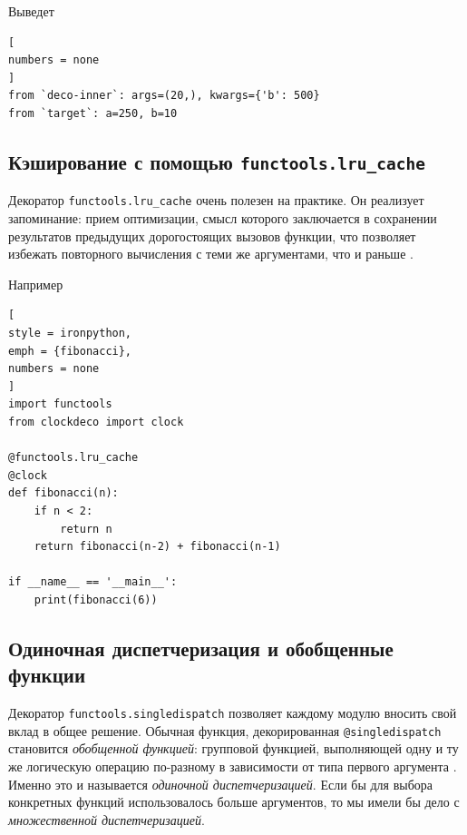\documentclass[%
	11pt,
	a4paper,
	utf8,
		]{article}
\begin{document}
Выведет

\begin{lstlisting}[
numbers = none
]
from `deco-inner`: args=(20,), kwargs={'b': 500}
from `target`: a=250, b=10
\end{lstlisting}

\subsection{Кэширование с помощью \texttt{functools.lru\_cache}}

Декоратор \texttt{functools.lru\_cache} очень полезен на практике. Он реализует запоминание: прием оптимизации, смысл которого заключается в сохранении результатов предыдущих дорогостоящих вызовов функции, что позволяет избежать повторного вычисления с теми же аргументами, что и раньше \cite[]{ramalho:python-2016}.

Например

\begin{lstlisting}[
style = ironpython,
emph = {fibonacci},
numbers = none
]
import functools
from clockdeco import clock

@functools.lru_cache
@clock
def fibonacci(n):
    if n < 2:
        return n
    return fibonacci(n-2) + fibonacci(n-1)
    
if __name__ == '__main__':
    print(fibonacci(6))
\end{lstlisting}


\subsection{Одиночная диспетчеризация и обобщенные функции}

Декоратор \texttt{functools.singledispatch} позволяет каждому модулю вносить свой вклад в общее решение. Обычная функция, декорированная \texttt{@singledispatch} становится \emph{обобщенной функцией}: групповой функцией, выполняющей одну и ту же логическую операцию по-разному в зависимости от типа первого аргумента \cite[]{ramalho:python-2016}. Именно это и называется \emph{одиночной диспетчеризацией}. Если бы для выбора конкретных функций использовалось больше аргументов, то мы имели бы дело с \emph{множественной диспетчеризацией}.
\end{document}
